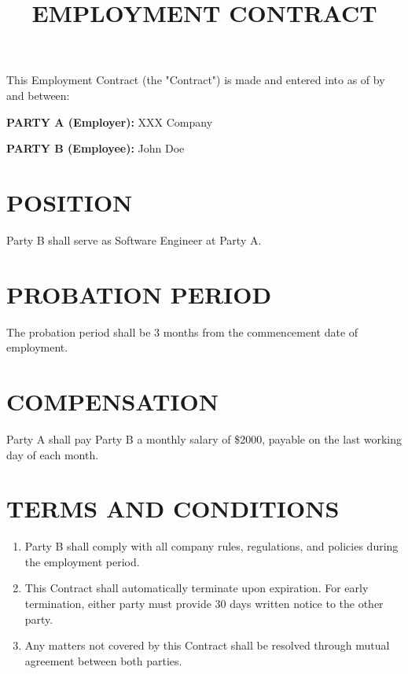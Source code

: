 \documentclass[12pt]{ctexart}
\title{EMPLOYMENT CONTRACT}
\author{}
\date{}
\begin{document}
\maketitle

\noindent This Employment Contract (the "Contract") is made and entered into as of \underline{\hspace{3cm}} by and between:

\vspace{0.5cm}

\noindent \textbf{PARTY A (Employer):} XXX Company

\noindent \textbf{PARTY B (Employee):} John Doe

\vspace{0.5cm}

\section*{POSITION}
Party B shall serve as Software Engineer at Party A.

\section*{PROBATION PERIOD}
The probation period shall be 3 months from the commencement date of employment.

\section*{COMPENSATION}
Party A shall pay Party B a monthly salary of \$2000, payable on the last working day of each month.

\section*{TERMS AND CONDITIONS}
\begin{enumerate}[leftmargin=*,label=\arabic*.]
    \item Party B shall comply with all company rules, regulations, and policies during the employment period.
    
    \item This Contract shall automatically terminate upon expiration. For early termination, either party must provide 30 days written notice to the other party.
    
    \item Any matters not covered by this Contract shall be resolved through mutual agreement between both parties.
\end{enumerate}
\end{document}
